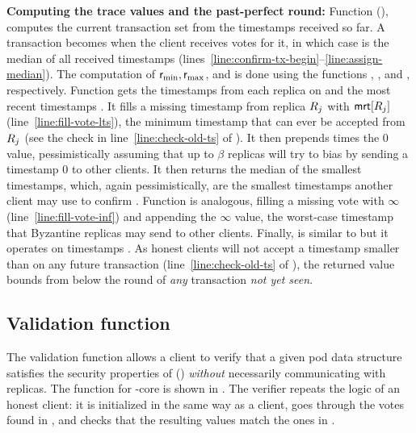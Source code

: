 \textbf{Computing the trace values and the past-perfect round:}
Function \opComputeTxSet{} (), computes the current transaction set from the timestamps received so far.
A transaction becomes \confirmed when the client receives \alpha votes for it, in which case \rconf is the median of all received timestamps (lines~\ref{line:confirm-tx-begin}--\ref{line:assign-median}).
The computation of $\textsf{r}_\text{min}, \textsf{r}_\text{max}$, and \rperf is done using the functions \opMinPossibleTs{}, \opMaxPossibleTs{}, and \opMinPossibleTsForNewTx{}, respectively.
Function \opMinPossibleTs{} gets the timestamps \txVotesMin from each replica on \tx and the most recent timestamps \mrt. It fills a missing timestamp from replica $R_j$ with $\textsf{mrt}[R_j]$ (line~\ref{line:fill-vote-lts}),
the minimum timestamp that can ever be  accepted from $R_j$ (see the check in line~\ref{line:check-old-ts} of ).
It then prepends \beta times the $0$ value, pessimistically assuming that up to $\beta$ replicas will try to bias \tx by sending a timestamp $0$ to other clients.
It then returns the median of the \alpha smallest timestamps, which, again pessimistically, are the smallest timestamps another client may use to confirm \tx.
Function \opMaxPossibleTs{} is analogous, filling a missing vote with $\infty$ (line~\ref{line:fill-vote-inf})
and appending the $\infty$ value, the worst-case timestamp that Byzantine replicas may send to other clients.
Finally, \opMinPossibleTsForNewTx{} is similar to \opMinPossibleTs{} but it operates on timestamps \mrt. As honest clients will not accept a timestamp smaller than \mrt on any future transaction (line~\ref{line:check-old-ts} of ), the returned value bounds from below the \confirmed round of \emph{any} transaction \emph{not yet seen}.


\subsection{Validation function}
The validation function \opValid{} allows a \podtm client to verify that a given pod data structure \Pod satisfies the security properties of \podtm () \emph{without} necessarily communicating with \podtm replicas.
The function \opValid{} for \podtm-core is shown in .
The verifier repeats the logic of an honest client:
it is initialized in the same way as a \podtm client, goes through the votes found in \alltxcert, and checks that the resulting values match the ones in \Pod.

